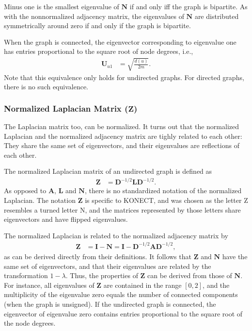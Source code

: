 \documentclass{article}
\begin{document}
Minus one is the smallest eigenvalue of $\mathbf N$ if and only iff the graph is
bipartite.  As with the nonnormalized adjacency matrix, the eigenvalues
of $\mathbf N$ are distributed symmetrically around zero if and only if
the graph is bipartite. 

When the graph is connected, 
the eigenvector corresponding to eigenvalue one has entries proportional
to the square root of node degrees, i.e.,
\begin{align*}
  \mathbf U_{u1} &= \sqrt{\frac{d(u)}{2m}}.
\end{align*}
Note that this equivalence only holds for undirected graphs.  For
directed graphs, there is no such equivalence. 

\subsubsection{Normalized Laplacian Matrix ($\mathbf Z$)}
The Laplacian matrix too, can be normalized.  It turns out that the
normalized Laplacian and the normalized adjacency matrix
are tighly related
to each other:  They share the same set of eigenvectors, and their
eigenvalues are reflections of each other.  

The normalized Laplacian matrix of an undirected graph is defined as 
\begin{align*}
  \mathbf Z &= \mathbf D^{-1/2} \mathbf L \mathbf D^{-1/2}.
\end{align*}
As opposed to $\mathbf A$, $\mathbf L$ and $\mathbf N$, there is no
standardized notation of the normalized Laplacian.  The notation
$\mathbf Z$ is specific to KONECT, and was chosen as the letter Z
resembles a turned letter N, and the matrices represented by those
letters share eigenvectors and have flipped eigenvalues. 

The normalized Laplacian is related to the normalized adjacency matrix
by 
\begin{align*}
  \mathbf Z &= \mathbf I - \mathbf N = \mathbf I - \mathbf D^{-1/2}
  \mathbf A \mathbf D^{-1/2}, 
\end{align*}
as can be derived directly from their definitions. 
It follows that $\mathbf Z$ and $\mathbf N$ have the same set of
eigenvectors, and that their eigenvalues are related by the
transformation $1 - \lambda$. Thus, the properties of $\mathbf Z$ can be
derived from those of $\mathbf N$. For instance, all eigenvalues of
$\mathbf Z$ are contained in the range $[0, 2]$, and the multiplicity of
the eigenvalue zero equals the number of connected components (when the
graph is unsigned). If the undirected graph is connected, the eigenvector of
eigenvalue zero contains entries proportional to the square root of the
node degrees. 
\end{document}
